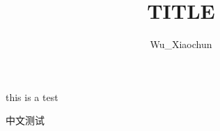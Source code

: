 ﻿\documentclass[12pt,a4paper,onecolumn]{article}
\title{TITLE}
\author{Wu_Xiaochun}
\date{}
\begin{document}
this is a test

中文测试
\end{document}
